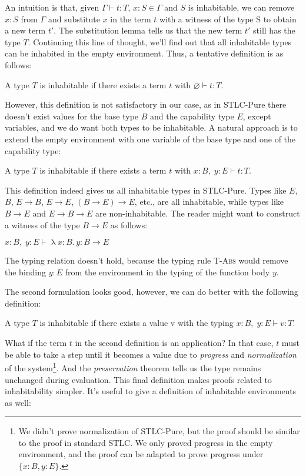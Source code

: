 An intuition is that, given $\Gamma \vdash t: T$, $x:S \in \Gamma$ and
$S$ is inhabitable, we can remove $x:S$ from $\Gamma$ and substitute $x$
in the term $t$ with a witness of the type S to obtain a new term
$t'$. The substitution lemma tells us that the new term $t'$ still has
the type $T$. Continuing this line of thought, we'll find out that all
inhabitable types can be inhabited in the empty environment. Thus, a
tentative definition is as follows:

\begin{definition}
  A type $T$ is inhabitable if there exists a term $t$ with
  $\varnothing \vdash t : T$.
\end{definition}

However, this definition is not satisfactory in our case, as in
STLC-Pure there doesn't exist values for the base type $B$ and the
capability type $E$, except variables, and we do want both types to be
inhabitable. A natural approach is to extend the empty environment
with one variable of the base type and one of the capability type:

\begin{definition}
  A type $T$ is inhabitable if there exists a term $t$ with
  $x:B,\; y:E \vdash t : T$.
\end{definition}

This definition indeed gives us all inhabitable types in
STLC-Pure. Types like $E$, $B$, $E \to B$, $E \to E$,
$(B \to E) \to E$, etc., are all inhabitable, while types like
$B \to E$ and $E \to B \to E$ are non-inhabitable. The reader might
want to construct a witness of the type $B \to E$ as follows:

\begin{center}
  $x:B, \; y:E \vdash \uplambda x{:}B {.}\, y : B \to E$
\end{center}

The typing relation doesn't hold, because the typing rule
\textsc{T-Abs} would remove the binding $y:E$ from the environment in
the typing of the function body $y$.

The second formulation looks good, however, we can do better with the
following definition:

\begin{definition}
  A type $T$ is inhabitable if there exists a value v with the typing
  $x:B, \; y:E \vdash v : T$.
\end{definition}

What if the term $t$ in the second definition is an application? In
that case, $t$ must be able to take a step until it becomes a value
due to \emph{progress} and \emph{normalization} of the
system\footnote{We didn't prove normalization of STLC-Pure, but the
  proof should be similar to the proof in standard STLC. We only
  proved progress in the empty environment, and the proof can be
  adapted to prove progress under $\{x:B, y:E\}$.}. And the
\emph{preservation} theorem tells us the type remains unchanged during
evaluation. This final definition makes proofs related to
inhabitability simpler. It's useful to give a definition of
inhabitable environments as well:

